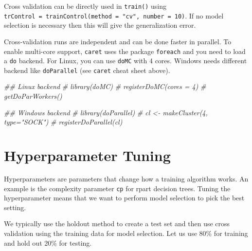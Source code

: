 \documentclass[
  notitlepage]{book}
\newenvironment{Shaded}{\begin{snugshade}}{\end{snugshade}}
\newcommand{\CommentTok}[1]{\textcolor[rgb]{0.56,0.35,0.01}{\textit{#1}}}
\newcommand{\DataTypeTok}[1]{\textcolor[rgb]{0.13,0.29,0.53}{#1}}
\newcommand{\DecValTok}[1]{\textcolor[rgb]{0.00,0.00,0.81}{#1}}
\newcommand{\ErrorTok}[1]{\textcolor[rgb]{0.64,0.00,0.00}{\textbf{#1}}}
\newcommand{\FloatTok}[1]{\textcolor[rgb]{0.00,0.00,0.81}{#1}}
\newcommand{\KeywordTok}[1]{\textcolor[rgb]{0.13,0.29,0.53}{\textbf{#1}}}
\newcommand{\NormalTok}[1]{#1}
\newcommand{\OperatorTok}[1]{\textcolor[rgb]{0.81,0.36,0.00}{\textbf{#1}}}
\newcommand{\StringTok}[1]{\textcolor[rgb]{0.31,0.60,0.02}{#1}}
\begin{document}
Cross validation can be directly used in \texttt{train()} using
\texttt{trControl\ =\ trainControl(method\ =\ "cv",\ number\ =\ 10)}.
If no model selection is necessary then this will give the
generalization error.

Cross-validation runs are independent and can be done faster in
parallel. To enable multi-core support, \texttt{caret} uses the package
\texttt{foreach} and you need to load a \texttt{do} backend. For Linux, you can use
\texttt{doMC} with 4 cores. Windows needs different backend like \texttt{doParallel}
(see \texttt{caret} cheat sheet above).

\begin{Shaded}
\begin{Highlighting}[]
\CommentTok{\#\# Linux backend}
\CommentTok{\# library(doMC)}
\CommentTok{\# registerDoMC(cores = 4)}
\CommentTok{\# getDoParWorkers()}

\CommentTok{\#\# Windows backend}
\CommentTok{\# library(doParallel)}
\CommentTok{\# cl \textless{}{-} makeCluster(4, type="SOCK")}
\CommentTok{\# registerDoParallel(cl)}
\end{Highlighting}
\end{Shaded}

\hypertarget{hyperparameter-tuning}{%
\section{Hyperparameter Tuning}\label{hyperparameter-tuning}}

Hyperparameters are parameters that change how a
training algorithm works. An example is the complexity parameter
\texttt{cp} for rpart decision trees. Tuning the hyperparameter means that
we want to perform model selection to pick the best setting.

We typically use the holdout method to create a test set and then use
cross validation using the training data for model selection. Let us use
80\% for training and hold out 20\% for testing.

\begin{Shaded}
\end{Shaded}
\end{document}
